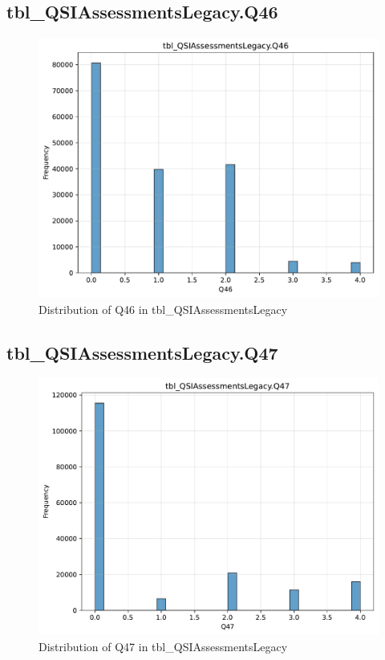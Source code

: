 \subsection{tbl\_QSIAssessmentsLegacy.Q46}

\begin{figure}[htbp]
\centering
\includegraphics[width=\textwidth]{figures/dbo_tbl_QSIAssessmentsLegacy_Q46.pdf}
\caption{Distribution of Q46 in tbl\_QSIAssessmentsLegacy}
\end{figure}\newpage

\subsection{tbl\_QSIAssessmentsLegacy.Q47}

\begin{figure}[htbp]
\centering
\includegraphics[width=\textwidth]{figures/dbo_tbl_QSIAssessmentsLegacy_Q47.pdf}
\caption{Distribution of Q47 in tbl\_QSIAssessmentsLegacy}
\end{figure}\newpage

